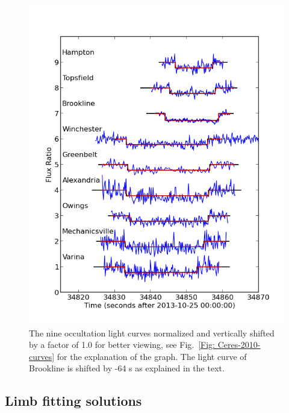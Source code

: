 \documentclass[useAMS,usenatbib]{mn2e}
\begin{document}
\begin{figure}
\includegraphics[scale=0.58]{figures/Ceres_2013_fluxratio} 
\caption{The nine occultation light curves normalized and vertically shifted by a factor of 1.0 for better viewing, see Fig.~\ref{Fig: Ceres-2010-curves} for the explanation of the graph.%
The light curve of Brookline is shifted by -64 s as explained in the text. \label{Fig: Ceres-2013-curves}}
\end{figure}




\subsection{Limb fitting solutions}
\end{document}
